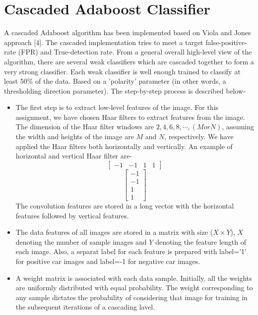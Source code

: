 \documentclass{article}
\begin{document}
\section{Cascaded Adaboost Classifier}
A cascaded Adaboost algorithm has been implemented based on Viola and Jones approach [4]. The cascaded implementation tries to meet a target false-positive-rate (FPR) and True-detection rate. From a general overall high-level view of the algorithm, there are several weak classifiers which are cascaded together to form a very strong classifier. Each weak classifier is well enough trained to classify at least 50\% of the data. Based on a 'polarity' parameter (in other words, a thresholding direction parameter). The step-by-step process is described below-
\begin{itemize}
\item The first step is to extract low-level features of the image. For this assignment, we have chosen Haar filters to extract features from the image. The dimension of the Haar filter windows are $2,4,6,8,\cdots,(M or N)$, assuming the width and heights of the image are $M$ and $N$, respectively. We have applied the Haar filters both horizontally and vertically. An example of horizontal and vertical Haar filter are-
\begin{equation}
	\begin{bmatrix}-1 & -1 & 1 & 1\end{bmatrix}
\end{equation}
\begin{equation}
	\begin{bmatrix}-1 \\ -1 \\ 1 \\ 1\end{bmatrix}
\end{equation}
The convolution features are stored in a long vector with the horizontal features followed by vertical features.
\item The data features of all images are stored in a matrix with size ($X\times Y$), $X$ denoting the number of sample images and $Y$ denoting the feature length of each image. Also, a separat label for each feature is prepared with label='1' for positive car images and label=-1 for negative car images.
\item A weight matrix is associated with each data sample. Initially, all the weights are uniformly distributed with equal probability. The weight corresponding to any  sample dictates the probability of considering that image for training in the subsequent iterations of a cascading lavel.

\end{itemize}
\end{document}

